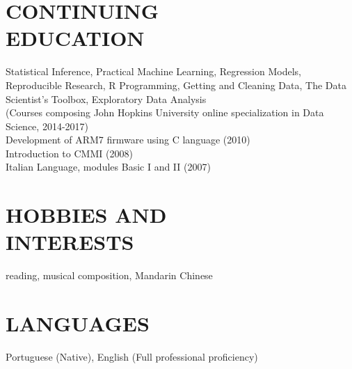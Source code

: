 \documentclass[line,margin]{res}
\begin{document}
\begin{resume}
	\section{CONTINUING \\ EDUCATION} Statistical Inference, Practical Machine Learning, Regression Models, Reproducible Research, 
                                    R Programming, Getting and Cleaning Data, The Data Scientist's Toolbox, Exploratory Data Analysis\\
                                    (Courses composing John Hopkins University online specialization in Data Science, 2014-2017)\\
                                  Development of ARM7 firmware using C language (2010) \\
                                  Introduction to CMMI (2008) \\
                                  Italian Language, modules Basic I and II (2007)

\section{HOBBIES AND \\ INTERESTS} reading, musical composition, Mandarin Chinese

\section{LANGUAGES} Portuguese (Native), English (Full professional proficiency)
 
\end{resume}
\end{document}
